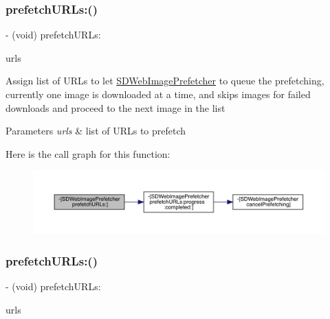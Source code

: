 \subsubsection{\texorpdfstring{prefetch\+U\+R\+Ls\+:()}{prefetchURLs:()}\hspace{0.1cm}{\footnotesize\ttfamily [2/3]}}
{\footnotesize\ttfamily -\/ (void) prefetch\+U\+R\+Ls\+: \begin{DoxyParamCaption}\item[{(N\+S\+Array $\ast$)}]{urls }\end{DoxyParamCaption}}

Assign list of U\+R\+Ls to let \mbox{\hyperlink{interface_s_d_web_image_prefetcher}{S\+D\+Web\+Image\+Prefetcher}} to queue the prefetching, currently one image is downloaded at a time, and skips images for failed downloads and proceed to the next image in the list


\begin{DoxyParams}{Parameters}
{\em urls} & list of U\+R\+Ls to prefetch \\
\hline
\end{DoxyParams}
Here is the call graph for this function\+:\nopagebreak
\begin{figure}[H]
\begin{center}
\leavevmode
\includegraphics[width=350pt]{interface_s_d_web_image_prefetcher_aca785918119f2b0d08ee1ff8b5310365_cgraph}
\end{center}
\end{figure}
\mbox{\label{interface_s_d_web_image_prefetcher_aca785918119f2b0d08ee1ff8b5310365}} 
\subsubsection{\texorpdfstring{prefetch\+U\+R\+Ls\+:()}{prefetchURLs:()}\hspace{0.1cm}{\footnotesize\ttfamily [3/3]}}
{\footnotesize\ttfamily -\/ (void) prefetch\+U\+R\+Ls\+: \begin{DoxyParamCaption}\item[{(N\+S\+Array $\ast$)}]{urls }\end{DoxyParamCaption}}

